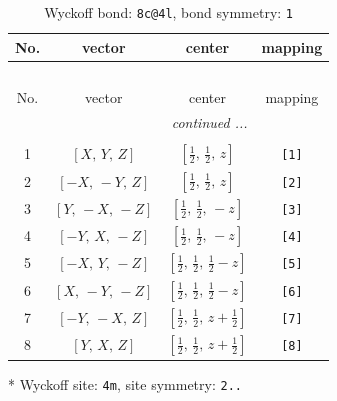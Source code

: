 \documentclass[fleqn,8pt]{jsarticle}
\begin{document}
\renewcommand{\arraystretch}{1.2}
\begin{longtable}{cccc}
\caption{Wyckoff bond: {\tt 8c@4l}, bond symmetry: {\tt 1}}
 \\
 \hline \hline
No. & vector & center & mapping \\ \hline \endfirsthead

\multicolumn{3}{l}{\tablename\ \thetable{}} \\
 \hline \hline
No. & vector & center & mapping \\ \hline \endhead

 \hline \hline
\multicolumn{3}{r}{\footnotesize\it continued ...} \\ \endfoot

 \hline \hline
\multicolumn{3}{r}{} \\ \endlastfoot

1 & $\left[ X,\, Y,\, Z \right]$ & $\left[ \frac{1}{2},\, \frac{1}{2},\, z \right]$ & {\tt [1]} \\ \hline
2 & $\left[ - X,\, - Y,\, Z \right]$ & $\left[ \frac{1}{2},\, \frac{1}{2},\, z \right]$ & {\tt [2]} \\ \hline
3 & $\left[ Y,\, - X,\, - Z \right]$ & $\left[ \frac{1}{2},\, \frac{1}{2},\, - z \right]$ & {\tt [3]} \\ \hline
4 & $\left[ - Y,\, X,\, - Z \right]$ & $\left[ \frac{1}{2},\, \frac{1}{2},\, - z \right]$ & {\tt [4]} \\ \hline
5 & $\left[ - X,\, Y,\, - Z \right]$ & $\left[ \frac{1}{2},\, \frac{1}{2},\, \frac{1}{2} - z \right]$ & {\tt [5]} \\ \hline
6 & $\left[ X,\, - Y,\, - Z \right]$ & $\left[ \frac{1}{2},\, \frac{1}{2},\, \frac{1}{2} - z \right]$ & {\tt [6]} \\ \hline
7 & $\left[ - Y,\, - X,\, Z \right]$ & $\left[ \frac{1}{2},\, \frac{1}{2},\, z + \frac{1}{2} \right]$ & {\tt [7]} \\ \hline
8 & $\left[ Y,\, X,\, Z \right]$ & $\left[ \frac{1}{2},\, \frac{1}{2},\, z + \frac{1}{2} \right]$ & {\tt [8]} \\
\end{longtable}
* Wyckoff site: {\tt 4m}, site symmetry: {\tt 2..}
\renewcommand{\arraystretch}{1.2}
\end{document}
